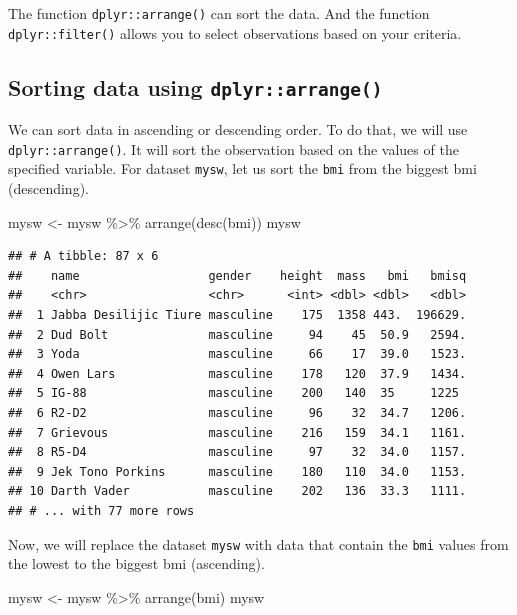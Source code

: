 \documentclass[
]{book}
\makeatletter
\newenvironment{Shaded}{\begin{snugshade}}{\end{snugshade}}
\newcommand{\FunctionTok}[1]{\textcolor[rgb]{0,0,0}{#1}}
\newcommand{\NormalTok}[1]{#1}
\newcommand{\OtherTok}[1]{\textcolor[rgb]{0.37,0.37,0.37}{#1}}
\newcommand{\SpecialCharTok}[1]{\textcolor[rgb]{0,0,0}{#1}}
\newenvironment{kframe}{%
\medskip{}
\setlength{\fboxsep}{.8em}
 \def\at@end@of@kframe{}%
 \ifinner\ifhmode%
  \def\at@end@of@kframe{\end{minipage}}%
  \begin{minipage}{\columnwidth}%
 \fi\fi%
 \def\FrameCommand##1{\hskip\@totalleftmargin \hskip-\fboxsep
 \colorbox{shadecolor}{##1}\hskip-\fboxsep
     \hskip-\linewidth \hskip-\@totalleftmargin \hskip\columnwidth}%
 \MakeFramed {\advance\hsize-\width
   \@totalleftmargin\z@ \linewidth\hsize
   \@setminipage}}%
 {\par\unskip\endMakeFramed%
 \at@end@of@kframe}
\renewenvironment{Shaded}{\begin{kframe}}{\end{kframe}}
\makeatother
\begin{document}
The function \texttt{dplyr::arrange()} can sort the data. And the function \texttt{dplyr::filter()} allows you to select observations based on your criteria.

\hypertarget{sorting-data-using-dplyrarrange}{%
\subsection{\texorpdfstring{Sorting data using \texttt{dplyr::arrange()}}{Sorting data using dplyr::arrange()}}\label{sorting-data-using-dplyrarrange}}

We can sort data in ascending or descending order. To do that, we will use \texttt{dplyr::arrange()}. It will sort the observation based on the values of the specified variable. For dataset \texttt{mysw}, let us sort the \texttt{bmi} from the biggest bmi (descending).

\begin{Shaded}
\begin{Highlighting}[]
\NormalTok{mysw }\OtherTok{\textless{}{-}}\NormalTok{ mysw }\SpecialCharTok{\%\textgreater{}\%} \FunctionTok{arrange}\NormalTok{(}\FunctionTok{desc}\NormalTok{(bmi))}
\NormalTok{mysw}
\end{Highlighting}
\end{Shaded}

\begin{verbatim}
## # A tibble: 87 x 6
##    name                  gender    height  mass   bmi   bmisq
##    <chr>                 <chr>      <int> <dbl> <dbl>   <dbl>
##  1 Jabba Desilijic Tiure masculine    175  1358 443.  196629.
##  2 Dud Bolt              masculine     94    45  50.9   2594.
##  3 Yoda                  masculine     66    17  39.0   1523.
##  4 Owen Lars             masculine    178   120  37.9   1434.
##  5 IG-88                 masculine    200   140  35     1225 
##  6 R2-D2                 masculine     96    32  34.7   1206.
##  7 Grievous              masculine    216   159  34.1   1161.
##  8 R5-D4                 masculine     97    32  34.0   1157.
##  9 Jek Tono Porkins      masculine    180   110  34.0   1153.
## 10 Darth Vader           masculine    202   136  33.3   1111.
## # ... with 77 more rows
\end{verbatim}

Now, we will replace the dataset \texttt{mysw} with data that contain the \texttt{bmi} values from the lowest to the biggest bmi (ascending).

\begin{Shaded}
\begin{Highlighting}[]
\NormalTok{mysw }\OtherTok{\textless{}{-}}\NormalTok{ mysw }\SpecialCharTok{\%\textgreater{}\%} \FunctionTok{arrange}\NormalTok{(bmi)}
\NormalTok{mysw}
\end{Highlighting}
\end{Shaded}
\end{document}
